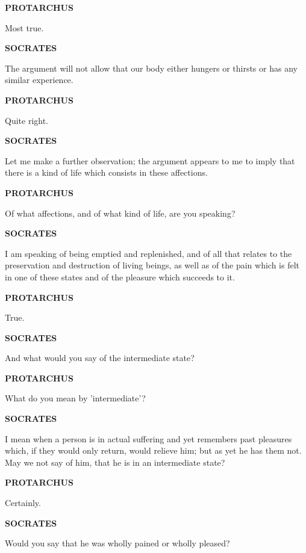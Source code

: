 \documentclass[11pt,letter]{article}
\begin{document}
\par \textbf{PROTARCHUS}
\par   Most true.

\par \textbf{SOCRATES}
\par   The argument will not allow that our body either hungers or thirsts or has any similar experience.

\par \textbf{PROTARCHUS}
\par   Quite right.

\par \textbf{SOCRATES}
\par   Let me make a further observation; the argument appears to me to imply that there is a kind of life which consists in these affections.

\par \textbf{PROTARCHUS}
\par   Of what affections, and of what kind of life, are you speaking?

\par \textbf{SOCRATES}
\par   I am speaking of being emptied and replenished, and of all that relates to the preservation and destruction of living beings, as well as of the pain which is felt in one of these states and of the pleasure which succeeds to it.

\par \textbf{PROTARCHUS}
\par   True.

\par \textbf{SOCRATES}
\par   And what would you say of the intermediate state?

\par \textbf{PROTARCHUS}
\par   What do you mean by 'intermediate'?

\par \textbf{SOCRATES}
\par   I mean when a person is in actual suffering and yet remembers past pleasures which, if they would only return, would relieve him; but as yet he has them not. May we not say of him, that he is in an intermediate state?

\par \textbf{PROTARCHUS}
\par   Certainly.

\par \textbf{SOCRATES}
\par   Would you say that he was wholly pained or wholly pleased?
\end{document}
